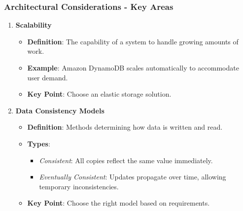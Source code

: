 \documentclass[aspectratio=169]{beamer}
\begin{document}
\begin{frame}[fragile]
    \frametitle{Architectural Considerations - Key Areas}
    \begin{enumerate}
        \item \textbf{Scalability}
            \begin{itemize}
                \item \textbf{Definition}: The capability of a system to handle growing amounts of work.
                \item \textbf{Example}: Amazon DynamoDB scales automatically to accommodate user demand.
                \item \textbf{Key Point}: Choose an elastic storage solution.
            \end{itemize}

        \item \textbf{Data Consistency Models}
            \begin{itemize}
                \item \textbf{Definition}: Methods determining how data is written and read.
                \item \textbf{Types}:
                    \begin{itemize}
                        \item \textit{Consistent}: All copies reflect the same value immediately.
                        \item \textit{Eventually Consistent}: Updates propagate over time, allowing temporary inconsistencies.
                    \end{itemize}
                \item \textbf{Key Point}: Choose the right model based on requirements.
            \end{itemize}
    \end{enumerate}
\end{frame}
\end{document}
